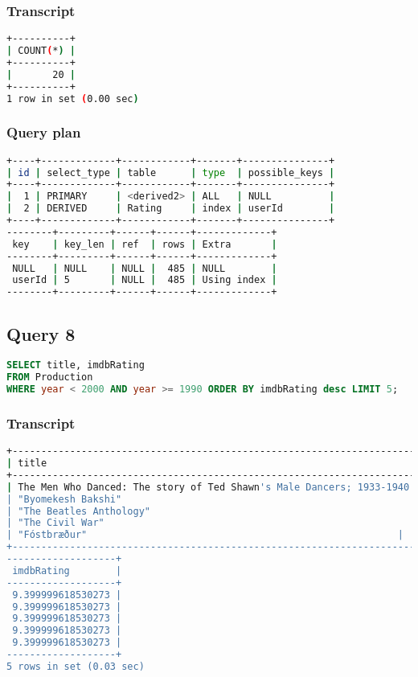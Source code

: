 \subsubsection{Transcript}
\begin{lstlisting}[language=bash]
+----------+
| COUNT(*) |
+----------+
|       20 |
+----------+
1 row in set (0.00 sec)
\end{lstlisting}

\subsubsection{Query plan}
\begin{lstlisting}[language=bash]
+----+-------------+------------+-------+---------------+
| id | select_type | table      | type  | possible_keys |
+----+-------------+------------+-------+---------------+
|  1 | PRIMARY     | <derived2> | ALL   | NULL          |
|  2 | DERIVED     | Rating     | index | userId        |
+----+-------------+------------+-------+---------------+
--------+---------+------+------+-------------+
 key    | key_len | ref  | rows | Extra       |
--------+---------+------+------+-------------+
 NULL   | NULL    | NULL |  485 | NULL        |
 userId | 5       | NULL |  485 | Using index |
--------+---------+------+------+-------------+
\end{lstlisting}


\bigskip
\subsection{Query 8}
\begin{lstlisting}[language=sql]
SELECT title, imdbRating
FROM Production
WHERE year < 2000 AND year >= 1990 ORDER BY imdbRating desc LIMIT 5;
\end{lstlisting}

\subsubsection{Transcript}
\begin{lstlisting}[language=bash]
+----------------------------------------------------------------------+
| title                                                                |
+----------------------------------------------------------------------+
| The Men Who Danced: The story of Ted Shawn's Male Dancers; 1933-1940 |
| "Byomekesh Bakshi"                                                   |
| "The Beatles Anthology"                                              |
| "The Civil War"                                                      |
| "Fóstbræður"                                                      |
+----------------------------------------------------------------------+
-------------------+
 imdbRating        |
-------------------+
 9.399999618530273 |
 9.399999618530273 |
 9.399999618530273 |
 9.399999618530273 |
 9.399999618530273 |
-------------------+
5 rows in set (0.03 sec)
\end{lstlisting}

